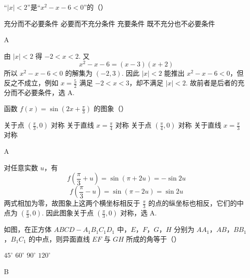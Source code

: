 \begin{problem}
“\(|x| < 2\)”是“\(x^2 - x - 6 < 0\)”的（\quad）

\choices
    {充分而不必要条件}
    {必要而不充分条件}
    {充要条件}
    {既不充分也不必要条件}
\end{problem}

\begin{answer}
A
\end{answer}

\begin{solution}
由 \(|x|<2\) 得 \(-2<x<2\). 又
\[
x^2-x-6=(x-3)(x+2)
\]
所以 \(x^2-x-6<0\) 的解集为 \((-2,3)\). 因此 \(|x|<2\) 能推出 \(x^2-x-6<0\)，但反之不成立，例如 \(x=\frac52\) 满足 \(-2<x<3\)，却不满足 \(|x|<2\). 故前者是后者的充分而不必要条件，选 A.
\end{solution}

\begin{problem}
函数 \(f(x) = \sin \left( 2x + \frac{\pi}{3} \right)\) 的图象（\quad）

\choices
    {关于点 \(\left( \frac{\pi}{3}, 0 \right)\) 对称}
    {关于直线 \(x = \frac{\pi}{4}\) 对称}
    {关于点 \(\left( \frac{\pi}{4}, 0 \right)\) 对称}
    {关于直线 \(x = \frac{\pi}{3}\) 对称}
\end{problem}

\begin{answer}
A
\end{answer}

\begin{solution}
对任意实数 \(u\)，有
\[
f\left(\frac{\pi}{3}+u\right)=\sin\left(\pi+2u\right)=-\sin2u
\]
\[
f\left(\frac{\pi}{3}-u\right)=\sin\left(\pi-2u\right)=\sin2u
\]
两式相加为零，故图象上这两个横坐标相反于 \(\frac{\pi}{3}\) 的点的纵坐标也相反，它们的中点为 \(\left(\frac{\pi}{3},0\right)\). 因此图象关于点 \(\left(\frac{\pi}{3},0\right)\) 对称，选 A.
\end{solution}

\begin{problem}
如图，在正方体 \(ABCD - A_1B_1C_1D_1\) 中，\(E\)，\(F\)，\(G\)，\(H\) 分别为 \(AA_1\)，\(AB\)，\(BB_1\)，\(B_1C_1\) 的中点，则异面直线 \(EF\) 与 \(GH\) 所成的角等于（\quad）


\choices
    {\(45^\circ\)}
    {\(60^\circ\)}
    {\(90^\circ\)}
    {\(120^\circ\)}
\end{problem}

\begin{answer}
B
\end{answer}

